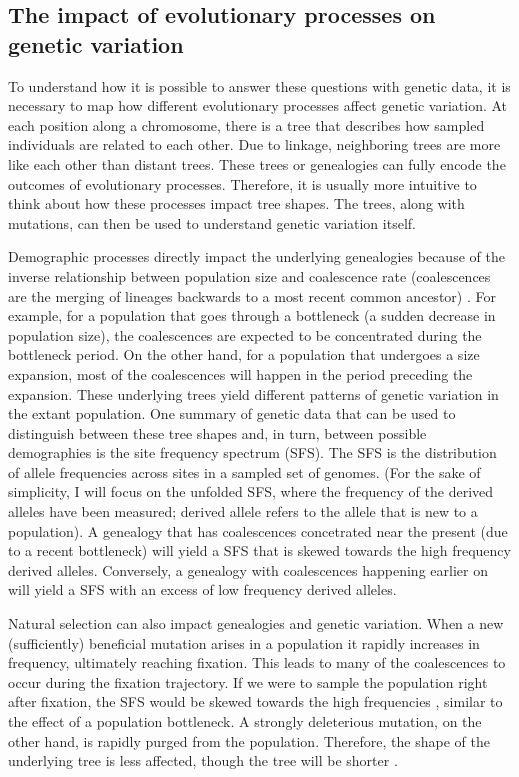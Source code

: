 \subsection{The impact of evolutionary processes on genetic variation}

To understand how it is possible to answer these questions with genetic data,
it is necessary to map how different evolutionary processes affect genetic variation.
At each position along a chromosome, there is a tree that describes how sampled individuals are related to each other.
Due to linkage, neighboring trees are more like each other than distant trees.
These trees or genealogies can fully encode the outcomes of evolutionary processes.
Therefore, it is usually more intuitive to think about how these processes impact tree shapes.
The trees, along with mutations, can then be used to understand genetic variation itself.

Demographic processes directly impact the underlying genealogies because of the inverse relationship between population size and coalescence rate (coalescences are the merging of lineages backwards to a most recent common ancestor) \citep{wakely_coalescent_2016}.
For example, for a population that goes through a bottleneck (\ie a sudden decrease in population size),
the coalescences are expected to be concentrated during the bottleneck period.
On the other hand, for a population that undergoes a size expansion,
most of the coalescences will happen in the period preceding the expansion.
These underlying trees yield different patterns of genetic variation in the extant population.
One summary of genetic data that can be used to distinguish between these tree shapes and,
in turn, between possible demographies is the site frequency spectrum (SFS).
The SFS is the distribution of allele frequencies across sites in a sampled set of genomes.
(For the sake of simplicity, I will focus on the unfolded SFS, where the frequency of the derived alleles have been measured; derived allele refers to the allele that is new to a population).
A genealogy that has coalescences concetrated near the present (due to a recent bottleneck) will yield a SFS that is skewed towards the high frequency derived alleles.
Conversely, a genealogy with coalescences happening earlier on will yield a SFS with an excess of low frequency derived alleles.

Natural selection can also impact genealogies and genetic variation.
When a new (sufficiently) beneficial mutation arises in a population it rapidly increases in frequency, ultimately reaching fixation.
This leads to many of the coalescences to occur during the fixation trajectory.
If we were to sample the population right after fixation,
the SFS would be skewed towards the high frequencies \citep{kim_allele_2006}, similar to the effect of a population bottleneck.
A strongly deleterious mutation, on the other hand, is rapidly purged from the population.
Therefore, the shape of the underlying tree is less affected, though the tree will be shorter \citep{williamson_genealogy_2002, barton_effect_2004}.

